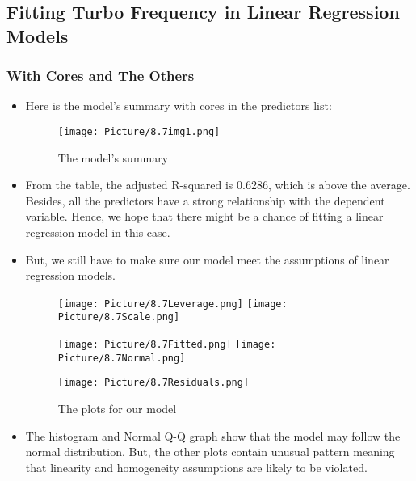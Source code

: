 \documentclass[a4paper]{article}
\begin{document}
\subsection{Fitting Turbo Frequency in Linear Regression Models}
\subsubsection{With Cores and The Others}
\begin{itemize}
    \item[] Here is the model's summary with cores in the predictors list:

    \begin{figure}[H]
        \centering
        \texttt{[image: Picture/8.7img1.png]}
        \caption{The model's summary}
        \label{8.3.1}
    \end{figure}
    
    \item[] From the table, the adjusted R-squared is 0.6286, which is above the average. Besides, all the predictors have a strong relationship with the dependent variable. Hence, we hope that there might be a chance of fitting a linear regression model in this case. 
    
    \item[] But, we still have to make sure our model meet the assumptions of linear regression models.
 
    \begin{figure}[H]
        \centering
        \texttt{[image: Picture/8.7Leverage.png]}
        \texttt{[image: Picture/8.7Scale.png]}
        \label{8.3.2}
    \end{figure}
    
    \begin{figure}[H]
        \centering
        \texttt{[image: Picture/8.7Fitted.png]}
        \texttt{[image: Picture/8.7Normal.png]}
        \label{8.3.3}
    \end{figure}
    
    \begin{figure}[H]
        \centering
        \texttt{[image: Picture/8.7Residuals.png]}
        \caption{The plots for our model}
        \label{8.3.4}
    \end{figure}

    \item[] The histogram and Normal Q-Q graph show that the model may follow the normal distribution. But, the other plots contain unusual pattern meaning that linearity and homogeneity assumptions are likely to be violated.
    

\end{itemize}
\end{document}
